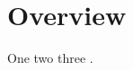 \documentclass{article}
\begin{document}
\section{Overview}
One two three \cite{alpha2020}.



\end{document}
